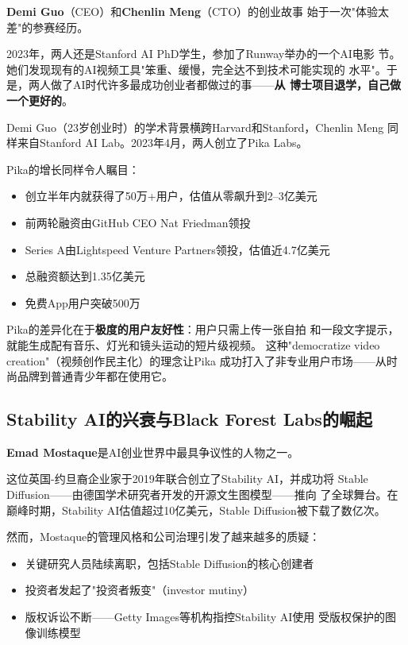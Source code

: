\textbf{Demi Guo}（CEO）和\textbf{Chenlin Meng}（CTO）的创业故事
始于一次"体验太差"的参赛经历。

2023年，两人还是Stanford AI PhD学生，参加了Runway举办的一个AI电影
节。她们发现现有的AI视频工具"笨重、缓慢，完全达不到技术可能实现的
水平"。于是，两人做了AI时代许多最成功创业者都做过的事——\textbf{从
博士项目退学，自己做一个更好的}。

Demi Guo（23岁创业时）的学术背景横跨Harvard和Stanford，Chenlin Meng
同样来自Stanford AI Lab。2023年4月，两人创立了Pika Labs。

Pika的增长同样令人瞩目：

\begin{itemize}
  \item 创立半年内就获得了50万+用户，估值从零飙升到2--3亿美元
  \item 前两轮融资由GitHub CEO Nat Friedman领投
  \item Series A由Lightspeed Venture Partners领投，估值近4.7亿美元
  \item 总融资额达到1.35亿美元
  \item 免费App用户突破500万
\end{itemize}

Pika的差异化在于\textbf{极度的用户友好性}：用户只需上传一张自拍
和一段文字提示，就能生成配有音乐、灯光和镜头运动的短片级视频。
这种"democratize video creation"（视频创作民主化）的理念让Pika
成功打入了非专业用户市场——从时尚品牌到普通青少年都在使用它。

\subsection{Stability AI的兴衰与Black Forest Labs的崛起}
\label{subsec:founders-stability-bfl}

\textbf{Emad Mostaque}是AI创业世界中最具争议性的人物之一。

这位英国-约旦裔企业家于2019年联合创立了Stability AI，并成功将
Stable Diffusion——由德国学术研究者开发的开源文生图模型——推向
了全球舞台。在巅峰时期，Stability AI估值超过10亿美元，Stable
Diffusion被下载了数亿次。

然而，Mostaque的管理风格和公司治理引发了越来越多的质疑：

\begin{itemize}
  \item 关键研究人员陆续离职，包括Stable Diffusion的核心创建者
  \item 投资者发起了"投资者叛变"（investor mutiny）
  \item 版权诉讼不断——Getty Images等机构指控Stability AI使用
    受版权保护的图像训练模型
\end{itemize}

